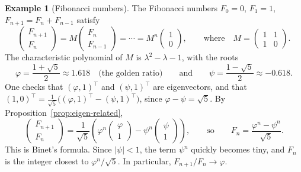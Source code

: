 \documentclass[11pt]{article}
\theoremstyle{definition}
\newtheorem{example}[definition]{Example}
\theoremstyle{plain}
\theoremstyle{remark}
\begin{document}
\begin{example}[Fibonacci numbers]\label{ex:binet}
    The Fibonacci numbers $F_0 = 0$, $F_1 = 1$, $F_{n+1} = F_n + F_{n-1}$ satisfy
    \[\begin{pmatrix} F_{n+1} \\ F_n \end{pmatrix} = M \begin{pmatrix} F_n \\ F_{n-1} \end{pmatrix} = \cdots = M^n \begin{pmatrix} 1 \\ 0 \end{pmatrix}, \qquad \text{where} \quad M = \begin{pmatrix} 1 & 1 \\ 1 & 0 \end{pmatrix}.\]
    The characteristic polynomial of $M$ is $\lambda^2 - \lambda - 1$, with the roots
    \[\varphi = \frac{1 + \sqrt{5}}{2} \approx 1.618 \quad \text{(the golden ratio)} \qquad \text{and} \qquad \psi = \frac{1 - \sqrt{5}}{2} \approx -0.618.\]
    One checks that $(\varphi, 1)^\top$ and $(\psi, 1)^\top$ are eigenvectors, and that $(1, 0)^\top = \frac{1}{\sqrt{5}}\big((\varphi, 1)^\top - (\psi, 1)^\top\big)$, since $\varphi - \psi = \sqrt{5}$. By Proposition~\ref{prop:eigen-related},
    \[\begin{pmatrix} F_{n+1} \\ F_n \end{pmatrix} = \frac{1}{\sqrt{5}}\left(\varphi^n \begin{pmatrix} \varphi \\ 1 \end{pmatrix} - \psi^n \begin{pmatrix} \psi \\ 1 \end{pmatrix}\right), \qquad \text{so} \qquad F_n = \frac{\varphi^n - \psi^n}{\sqrt{5}}.\]
    This is Binet's formula. Since $|\psi| < 1$, the term $\psi^n$ quickly becomes tiny, and $F_n$ is the integer closest to $\varphi^n / \sqrt{5}$. In particular, $F_{n+1}/F_n \to \varphi$.
\end{example}
\end{document}
